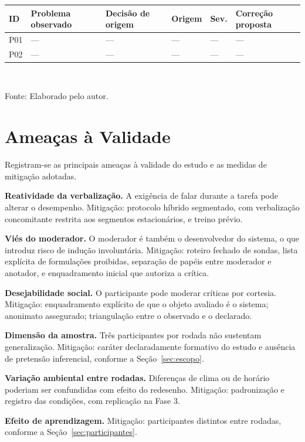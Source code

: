 \begin{quadro}[htb]
\centering
\caption{Estrutura da matriz de rastreabilidade}
\label{quad:matriz_modelo}
\footnotesize
\begin{tabular}{p{1.0cm} p{2.6cm} p{2.6cm} p{1.6cm} p{1.4cm} p{2.4cm}}
\toprule
\textbf{ID} & \textbf{Problema observado} & \textbf{Decisão de origem} &
\textbf{Origem} & \textbf{Sev.} & \textbf{Correção proposta} \\
\midrule
P01 & --- & --- & --- & --- & --- \\
P02 & --- & --- & --- & --- & --- \\
\bottomrule
\end{tabular}
\\[4pt]
\begin{flushleft}
Fonte: Elaborado pelo autor.
\end{flushleft}
\end{quadro}

\section{Ameaças à Validade}
\label{sec:ameacas}

Registram-se as principais ameaças à validade do estudo e as medidas de mitigação
adotadas.

\begin{alineas}
  \item \textbf{Reatividade da verbalização.} A exigência de falar durante a
  tarefa pode alterar o desempenho. Mitigação: protocolo híbrido segmentado, com
  verbalização concomitante restrita aos segmentos estacionários, e treino prévio.

  \item \textbf{Viés do moderador.} O moderador é também o desenvolvedor do
  sistema, o que introduz risco de indução involuntária. Mitigação: roteiro
  fechado de sondas, lista explícita de formulações proibidas, separação de papéis
  entre moderador e anotador, e enquadramento inicial que autoriza a crítica.

  \item \textbf{Desejabilidade social.} O participante pode moderar críticas por
  cortesia. Mitigação: enquadramento explícito de que o objeto avaliado é o
  sistema; anonimato assegurado; triangulação entre o observado e o declarado.

  \item \textbf{Dimensão da amostra.} Três participantes por rodada não sustentam
  generalização. Mitigação: caráter declaradamente formativo do estudo e ausência
  de pretensão inferencial, conforme a Seção~\ref{sec:escopo}.

  \item \textbf{Variação ambiental entre rodadas.} Diferenças de clima ou de
  horário poderiam ser confundidas com efeito do redesenho. Mitigação:
  padronização e registro das condições, com replicação na Fase 3.

  \item \textbf{Efeito de aprendizagem.} Mitigação: participantes distintos entre
  rodadas, conforme a Seção~\ref{sec:participantes}.
\end{alineas}

